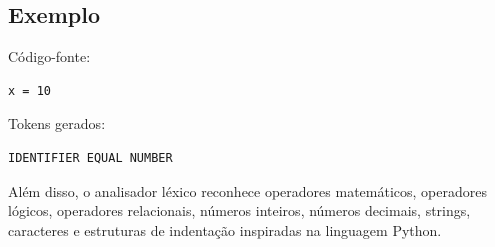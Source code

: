 \documentclass[a4paper,12pt]{article}
\begin{document}
\subsection{Exemplo}

Código-fonte:

\begin{lstlisting}
x = 10
\end{lstlisting}

Tokens gerados:

\begin{lstlisting}
IDENTIFIER EQUAL NUMBER
\end{lstlisting}

Além disso, o analisador léxico reconhece operadores matemáticos, operadores lógicos, operadores relacionais, números inteiros, números decimais, strings, caracteres e estruturas de indentação inspiradas na linguagem Python.
\end{document}
